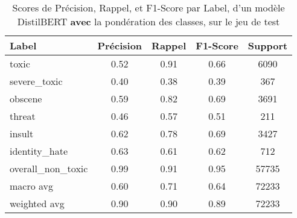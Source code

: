\begin{table}[ht]
    \centering
    \caption{Scores de Précision, Rappel, et F1-Score par Label, d'un modèle DistilBERT \textbf{avec} la pondération des classes, sur le jeu de test}    \begin{tabular}{lcccc}
    \hline
    \textbf{Label} & \textbf{Précision} & \textbf{Rappel} & \textbf{F1-Score} & \textbf{Support} \\ \hline
    toxic          & 0.52               & 0.91            & 0.66              & 6090             \\
    severe\_toxic  & 0.40               & 0.38            & 0.39              & 367              \\
    obscene        & 0.59               & 0.82            & 0.69              & 3691             \\
    threat         & 0.46               & 0.57            & 0.51              & 211              \\
    insult         & 0.62               & 0.78            & 0.69              & 3427             \\
    identity\_hate & 0.63               & 0.61            & 0.62              & 712              \\
    overall\_non\_toxic & 0.99           & 0.91            & 0.95              & 57735            \\\hline
    macro avg      & 0.60              & 0.71            & 0.64              & 72233            \\
    weighted avg   & 0.90               & 0.90            & 0.89             & 72233            \\ \hline
    \end{tabular}
    \label{tab:scores}
\end{table}
